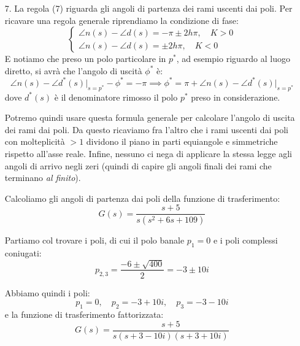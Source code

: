 \documentclass[a4paper,11pt]{article}
\begin{document}
\begin{enumerate}
	\item[7.] La regola (7) riguarda gli angoli di partenza dei rami uscenti dai poli.
		Per ricavare una regola generale riprendiamo la condizione di fase:
		\[
			\begin{cases}
				\angle n(s) - \angle d(s) = -\pi \pm 2 h \pi, \quad K > 0 \\
				\angle n(s) - \angle d(s) = \pm 2 h \pi, \quad K < 0
			\end{cases}
		\]
		E notiamo che preso un polo particolare in $p^*$, ad esempio riguardo al luogo diretto, si avrà che l'angolo di uscità $\phi^*$ è:
		$$
		\angle n(s) - \angle d^*(s) \Big|_{s = p^*} - \phi^* = -\pi \implies \phi^* = \pi + \angle n(s) - \angle d^*(s) \Big|_{s = p^*}
		$$
		dove $d^*(s)$ è il denominatore rimosso il polo $p^*$ preso in considerazione.

		Potremo quindi usare questa formula generale per calcolare l'angolo di uscita dei rami dai poli.
		Da questo ricaviamo fra l'altro che i rami uscenti dai poli con molteplicità $> 1$ dividono il piano in parti equiangole e simmetriche rispetto all'asse reale.
		Infine, nessuno ci nega di applicare la stessa legge agli angoli di arrivo negli zeri (quindi di capire gli angoli finali dei rami che terminano \textit{al finito}).

		\par\medskip
		\noindent
		\textbf{}

		Calcoliamo gli angoli di partenza dai poli della funzione di trasferimento:
		$$
		G(s) = \frac{s + 5}{s (s^2 + 6s + 109)}
		$$
		
		Partiamo col trovare i poli, di cui il polo banale $p_1 = 0$ e i poli complessi coniugati:
		$$
		p_{2, 3} = \frac{-6 \pm \sqrt{400}}{2} = -3 \pm 10i
		$$
		
		Abbiamo quindi i poli:
		$$
			p_1 = 0, \quad p_2 = -3 + 10 i, \quad p_3 = -3 - 10 i
		$$
		e la funzione di trasferimento fattorizzata:
		$$
		G(s) = \frac{s + 5}{s(s + 3 - 10i)(s + 3 + 10i)}
		$$


\end{enumerate}
\end{document}
